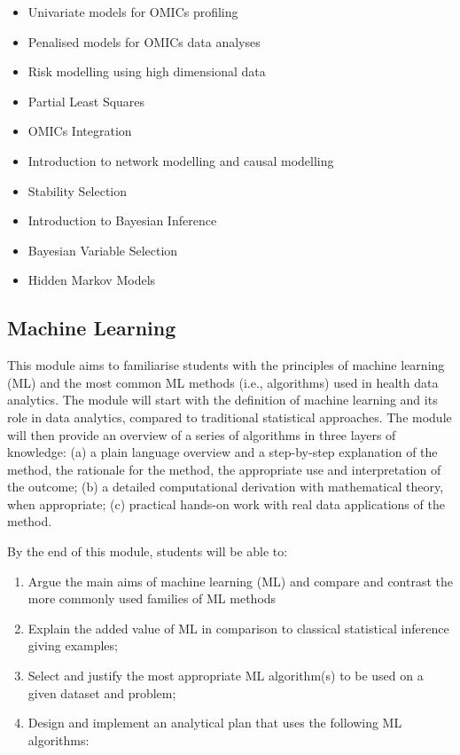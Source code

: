 \documentclass[
]{book}
\providecommand{\tightlist}{%
  \setlength{\itemsep}{0pt}\setlength{\parskip}{0pt}}
\begin{document}
\begin{itemize}
\tightlist
\item
  Univariate models for OMICs profiling
\item
  Penalised models for OMICs data analyses
\item
  Risk modelling using high dimensional data
\item
  Partial Least Squares
\item
  OMICs Integration
\item
  Introduction to network modelling and causal modelling
\item
  Stability Selection
\item
  Introduction to Bayesian Inference
\item
  Bayesian Variable Selection
\item
  Hidden Markov Models
\end{itemize}

\subsection*{Machine Learning}\label{machine-learning}

This module aims to familiarise students with the principles of machine learning (ML) and the most common ML methods (i.e., algorithms) used in health data analytics. The module will start with the definition of machine learning and its role in data analytics, compared to traditional statistical approaches. The module will then provide an overview of a series of algorithms in three layers of knowledge: (a) a plain language overview and a step-by-step explanation of the method, the rationale for the method, the appropriate use and interpretation of the outcome; (b) a detailed computational derivation with mathematical theory, when appropriate; (c) practical hands-on work with real data applications of the method.

By the end of this module, students will be able to:

\begin{enumerate}
\def\labelenumi{\arabic{enumi}.}
\tightlist
\item
  Argue the main aims of machine learning (ML) and compare and contrast the more commonly used families of ML methods
\item
  Explain the added value of ML in comparison to classical statistical inference giving examples;
\item
  Select and justify the most appropriate ML algorithm(s) to be used on a given dataset and problem;
\item
  Design and implement an analytical plan that uses the following ML algorithms:
\end{enumerate}
\end{document}
